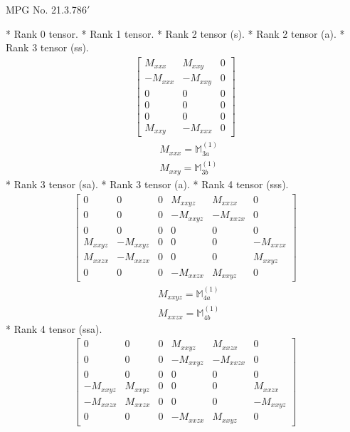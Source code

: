 \documentclass[fleqn,8pt,landscape]{jsarticle}
\begin{document}
\setcounter{MaxMatrixCols}{32}

\renewcommand{\tablename}{Table~}
\renewcommand{\figurename}{Figure~}
\begin{center}
\LARGE
MPG No. 21.3.78\quad$6'$
\end{center}
* Rank 0 tensor.
* Rank 1 tensor.
* Rank 2 tensor (s).
* Rank 2 tensor (a).
* Rank 3 tensor (ss).
\begin{align*}
\begin{bmatrix} M_{xxx} & M_{xxy} & 0 \\ - M_{xxx} & - M_{xxy} & 0 \\ 0 & 0 & 0 \\ 0 & 0 & 0 \\ 0 & 0 & 0 \\ M_{xxy} & - M_{xxx} & 0 \end{bmatrix}
\end{align*}
\begin{align*}
& M_{xxx} = \mathbb{M}_{3a}^{(1)} \\
& M_{xxy} = \mathbb{M}_{3b}^{(1)}
\end{align*}
* Rank 3 tensor (sa).
* Rank 3 tensor (a).
* Rank 4 tensor (sss).
\begin{align*}
\begin{bmatrix} 0 & 0 & 0 & M_{xxyz} & M_{xxzx} & 0 \\ 0 & 0 & 0 & - M_{xxyz} & - M_{xxzx} & 0 \\ 0 & 0 & 0 & 0 & 0 & 0 \\ M_{xxyz} & - M_{xxyz} & 0 & 0 & 0 & - M_{xxzx} \\ M_{xxzx} & - M_{xxzx} & 0 & 0 & 0 & M_{xxyz} \\ 0 & 0 & 0 & - M_{xxzx} & M_{xxyz} & 0 \end{bmatrix}
\end{align*}
\begin{align*}
& M_{xxyz} = \mathbb{M}_{4a}^{(1)} \\
& M_{xxzx} = \mathbb{M}_{4b}^{(1)}
\end{align*}
* Rank 4 tensor (ssa).
\begin{align*}
\begin{bmatrix} 0 & 0 & 0 & M_{xxyz} & M_{xxzx} & 0 \\ 0 & 0 & 0 & - M_{xxyz} & - M_{xxzx} & 0 \\ 0 & 0 & 0 & 0 & 0 & 0 \\ - M_{xxyz} & M_{xxyz} & 0 & 0 & 0 & M_{xxzx} \\ - M_{xxzx} & M_{xxzx} & 0 & 0 & 0 & - M_{xxyz} \\ 0 & 0 & 0 & - M_{xxzx} & M_{xxyz} & 0 \end{bmatrix}
\end{align*}
\end{document}
